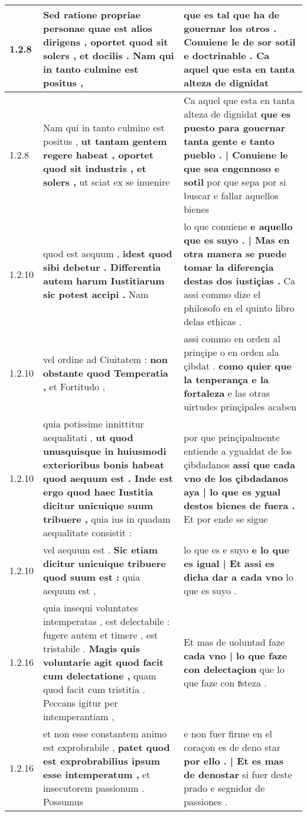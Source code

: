 \begin{tabular}{|p{1cm}|p{6.5cm}|p{6.5cm}|}
1.2.8 & Sed ratione propriae personae quae est alios dirigens , \textbf{ oportet quod sit solers , et docilis . } Nam qui in tanto culmine est positus , & que es tal que ha de gouernar los otros . \textbf{ Conuiene le de sor sotil e doctrinable . } Ca aquel que esta en tanta alteza de dignidat \\\hline
1.2.8 & Nam qui in tanto culmine est positus , \textbf{ ut tantam gentem regere habeat , oportet quod sit industris , et solers , } ut sciat ex se inuenire & Ca aquel que esta en tanta alteza de dignidat \textbf{ que es puesto para gouernar tanta gente e tanto pueblo . | Conuiene le que sea engennoso e sotil } por que sepa por si buscar e fallar aquellos bienes \\\hline
1.2.10 & quod est aequum , \textbf{ idest quod sibi debetur . Differentia autem harum Iustitiarum sic potest accipi . } Nam & lo que conuiene \textbf{ e aquello que es suyo . | Mas en otra manera se puede tomar la diferençia destas dos iustiçias . } Ca assi commo dize el philosofo en el quinto libro delas ethicas . \\\hline
1.2.10 & vel ordine ad Ciuitatem : \textbf{ non obstante quod Temperatia , } et Fortitudo , & assi commo en orden al prinçipe o en orden ala çibdat . \textbf{ como quier que la tenperança e la fortaleza } e las otras uirtudes prinçipales acaben \\\hline
1.2.10 & quia potissime innittitur aequalitati , \textbf{ ut quod unusquisque in huiusmodi exterioribus bonis habeat quod aequum est . Inde est ergo quod haec Iustitia dicitur unicuique suum tribuere , } quia ius in quadam aequalitate consistit : & por que prinçipalmente entiende a ygualdat de los çibdadanos \textbf{ assi que cada vno de los çibdadanos aya | lo que es ygual destos bienes de fuera . } Et por ende se sigue \\\hline
1.2.10 & vel aequum est . \textbf{ Sic etiam dicitur unicuique tribuere quod suum est : } quia aequum est , & lo que es e suyo \textbf{ e lo que es igual | Et assi es dicha dar a cada vno } lo que es suyo . \\\hline
1.2.16 & quia insequi voluntates intemperatas , est delectabile : fugere autem et timere , est tristabile . \textbf{ Magis quis voluntarie agit quod facit cum delectatione , } quam quod facit cum tristitia . Peccans igitur per intemperantiam , & Et mas de uoluntad faze \textbf{ cada vno | lo que faze con delectaçion } que lo que faze con tͥsteza . \\\hline
1.2.16 & et non esse constantem animo est exprobrabile , \textbf{ patet quod est exprobrabilius ipsum esse intemperatum , } et insecutorem passionum . Possumus & e non fuer firme en el coraçon es de deno star \textbf{ por ello . | Et es mas de denostar } si fuer deste prado e segnidor de passiones . \\\hline

\end{tabular}
